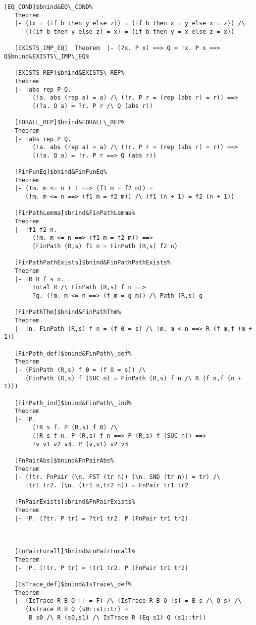 \documentclass[12pt]{article}
\begin{document}
\begin{footnotesize}
\begin{Verbatim}[commandchars=\$\&\%]
   [EQ_COND]$bnind&EQ\_COND%
   Theorem
   |- ((x = (if b then y else z)) = (if b then x = y else x = z)) /\
      (((if b then y else z) = x) = (if b then y = x else z = x))
   
   [EXISTS_IMP_EQ]  Theorem  |- (?x. P x) ==> Q = !x. P x ==> Q$bnind&EXISTS\_IMP\_EQ%
   
   [EXISTS_REP]$bnind&EXISTS\_REP%
   Theorem
   |- !abs rep P Q.
        (!a. abs (rep a) = a) /\ (!r. P r = (rep (abs r) = r)) ==>
        ((?a. Q a) = ?r. P r /\ Q (abs r))
   
   [FORALL_REP]$bnind&FORALL\_REP%
   Theorem
   |- !abs rep P Q.
        (!a. abs (rep a) = a) /\ (!r. P r = (rep (abs r) = r)) ==>
        ((!a. Q a) = !r. P r ==> Q (abs r))
   
   [FinFunEq]$bnind&FinFunEq%
   Theorem
   |- (!m. m <= n + 1 ==> (f1 m = f2 m)) =
      (!m. m <= n ==> (f1 m = f2 m)) /\ (f1 (n + 1) = f2 (n + 1))
   
   [FinPathLemma]$bnind&FinPathLemma%
   Theorem
   |- !f1 f2 n.
        (!m. m <= n ==> (f1 m = f2 m)) ==>
        (FinPath (R,s) f1 n = FinPath (R,s) f2 n)
   
   [FinPathPathExists]$bnind&FinPathPathExists%
   Theorem
   |- !R B f s n.
        Total R /\ FinPath (R,s) f n ==>
        ?g. (!m. m <= n ==> (f m = g m)) /\ Path (R,s) g
   
   [FinPathThm]$bnind&FinPathThm%
   Theorem
   |- !n. FinPath (R,s) f n = (f 0 = s) /\ !m. m < n ==> R (f m,f (m + 1))
   
   [FinPath_def]$bnind&FinPath\_def%
   Theorem
   |- (FinPath (R,s) f 0 = (f 0 = s)) /\
      (FinPath (R,s) f (SUC n) = FinPath (R,s) f n /\ R (f n,f (n + 1)))
   
   [FinPath_ind]$bnind&FinPath\_ind%
   Theorem
   |- !P.
        (!R s f. P (R,s) f 0) /\
        (!R s f n. P (R,s) f n ==> P (R,s) f (SUC n)) ==>
        !v v1 v2 v3. P (v,v1) v2 v3
   
   [FnPairAbs]$bnind&FnPairAbs%
   Theorem
   |- (!tr. FnPair (\n. FST (tr n)) (\n. SND (tr n)) = tr) /\
      !tr1 tr2. (\n. (tr1 n,tr2 n)) = FnPair tr1 tr2
   
   [FnPairExists]$bnind&FnPairExists%
   Theorem
   |- !P. (?tr. P tr) = ?tr1 tr2. P (FnPair tr1 tr2)
   


   [FnPairForall]$bnind&FnPairForall%
   Theorem
   |- !P. (!tr. P tr) = !tr1 tr2. P (FnPair tr1 tr2)
   
   [IsTrace_def]$bnind&IsTrace\_def%
   Theorem
   |- (IsTrace R B Q [] = F) /\ (IsTrace R B Q [s] = B s /\ Q s) /\
      (IsTrace R B Q (s0::s1::tr) =
       B s0 /\ R (s0,s1) /\ IsTrace R (Eq s1) Q (s1::tr))
   

\end{Verbatim}
\end{footnotesize}
\end{document}

